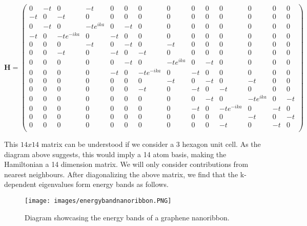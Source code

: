 \documentclass[a4paper,12pt]{report}
\begin{document}
$$        \mathbf{H} = \begin{pmatrix}
0 & -t  & 0   & -t    &  0  &  0  & 0  & 0  &  0  &  0  &  0  &  0  &  0  &  0  \\
-t & 0  & -t   & 0    &  0  &  0  & 0  & 0  &  0  &  0  &  0  &  0  &  0  &  0 \\
0 & -t  & 0   & -te^{ika}    &  0  &  -t  & 0  & 0  &  0  &  0  &  0  &  0  &  0  &  0 \\
-t & 0  & -te^{-ika}   & 0    &  -t  &  0  & 0  & 0  &  0  &  0  &  0  &  0  &  0  &  0 \\
0 & 0  & 0   & -t    &  0  &  -t  & 0  & -t  &  0  &  0  &  0  &  0  &  0  &  0 \\
0 & 0  & -t   & 0    &  -t  &  0  & -t  & 0  &  0  &  0  &  0  &  0  &  0  &  0 \\
0 & 0  & 0   & 0    &  0  &  -t  & 0  & -te^{ika}  &  0  &  -t  &  0  &  0  &  0  &  0 \\
0 & 0  & 0   & 0    &  -t  &  0  & -te^{-ika}  & 0  &  -t  &  0  &  0  &  0  &  0  &  0 \\
0 & 0  & 0   & 0    &  0  &  0  & 0  & -t  &  0  &  -t &  0  &  -t  &  0  &  0 \\
0 & 0  & 0   & 0    &  0  &  0  & -t  & 0  &  -t  &  0  &  -t  &  0  &  0  &  0 \\
0 & 0  & 0   & 0    &  0  &  0  & 0  & 0  &  0  &  -t  &  0  &  -te^{ika}  &  0  &  -t \\
0 & 0  & 0   & 0    &  0  &  0  & 0  & 0  &  -t  &  0  &  -te^{-ika}  &  0  &  -t  &  0 \\
0 & 0  & 0   & 0    &  0  &  0  & 0  & 0  &  0  &  0  &  0  &  -t  &  0  &  -t \\
0 & 0  & 0   & 0    &  0  &  0  & 0  & 0  &  0  &  0  &  -t  &  0  &  -t  &  0 \\
\end{pmatrix}
$$


This $ 14 x 14 $ matrix can be understood if we consider a 3 hexagon unit cell. As the diagram above suggests, this would imply a 14 atom basis, making the Hamiltonian a 14 dimension matrix. We will only consider contributions from nearest neighbours. After diagonalizing the above matrix, we find that the k-dependent eigenvalues form energy bands as follows.

\begin{figure}[h]
	\begin{center}
		\texttt{[image: images/energybandnanoribbon.PNG]}
	\end{center}
	\caption{Diagram showcasing the energy bands of a graphene nanoribbon.} 
	\label{fig:GNRbands}
\end{figure}
\end{document}
